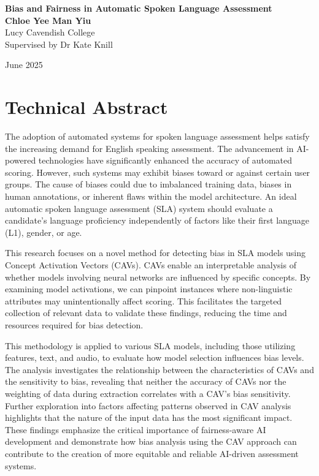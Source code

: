 \begin{center}
    \Large
    \textbf{Bias and Fairness in Automatic Spoken Language Assessment}
    \vspace{0.2in} \\

    \normalsize
    \textbf{Chloe Yee Man Yiu} \\
    Lucy Cavendish College \\
    Supervised by Dr Kate Knill
    \vspace{0.1in}

    June 2025
\end{center}

\section*{Technical Abstract}
The adoption of automated systems for spoken language assessment helps satisfy the increasing demand for English speaking assessment. The advancement in AI-powered technologies have significantly enhanced the accuracy of automated scoring. However, such systems may exhibit biases toward or against certain user groups. The cause of biases could due to imbalanced training data, biases in human annotations, or inherent flaws within the model architecture. An ideal automatic spoken language assessment (SLA) system should evaluate a candidate's language proficiency independently of factors like their first language (L1), gender, or age.

This research focuses on a novel method for detecting bias in SLA models using Concept Activation Vectors (CAVs). CAVs enable an interpretable analysis of whether models involving neural networks are influenced by specific concepts. By examining model activations, we can pinpoint instances where non-linguistic attributes may unintentionally affect scoring. This facilitates the targeted collection of relevant data to validate these findings, reducing the time and resources required for bias detection.

This methodology is applied to various SLA models, including those utilizing features, text, and audio, to evaluate how model selection influences bias levels. The analysis investigates the relationship between the characteristics of CAVs and the sensitivity to bias, revealing that neither the accuracy of CAVs nor the weighting of data during extraction correlates with a CAV's bias sensitivity. Further exploration into factors affecting patterns observed in CAV analysis highlights that the nature of the input data has the most significant impact. These findings emphasize the critical importance of fairness-aware AI development and demonstrate how bias analysis using the CAV approach can contribute to the creation of more equitable and reliable AI-driven assessment systems.

\clearpage
